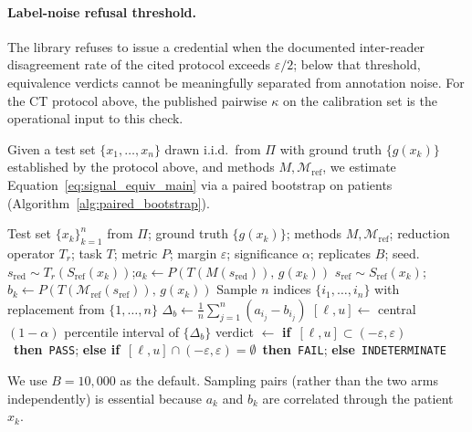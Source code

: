 \documentclass[twoside,11pt]{article}
\newcommand{\Mref}{\mathcal{M}_{\textrm{ref}}}
\newcommand{\Sref}{S_{\textrm{ref}}}
\begin{document}
\paragraph{Label-noise refusal threshold.} The library refuses to issue a credential when the documented inter-reader disagreement rate of the cited protocol exceeds $\varepsilon / 2$; below that threshold, equivalence verdicts cannot be meaningfully separated from annotation noise. For the CT protocol above, the published pairwise $\kappa$ on the calibration set is the operational input to this check.

Given a test set $\{x_1, \ldots, x_n\}$ drawn i.i.d.\ from $\Pi$ with ground truth $\{g(x_k)\}$ established by the protocol above, and methods $M, \Mref$, we estimate Equation~\eqref{eq:signal_equiv_main} via a paired bootstrap on patients (Algorithm~\ref{alg:paired_bootstrap}).

\begin{algorithm}[ht]
    \caption{Paired-bootstrap signal-equivalence credential}
    \label{alg:paired_bootstrap}
    \begin{algorithmic}[1]
        \Require Test set $\{x_k\}_{k=1}^n$ from $\Pi$; ground truth $\{g(x_k)\}$; methods $M, \Mref$; reduction operator $T_r$; task $T$; metric $P$; margin $\varepsilon$; significance $\alpha$; replicates $B$; seed.
            \State $s_{\textrm{red}} \sim T_r(\Sref(x_k))$;\quad $a_k \gets P(T(M(s_{\textrm{red}})),\, g(x_k))$
            \State $s_{\textrm{ref}} \sim \Sref(x_k)$;\quad $b_k \gets P(T(\Mref(s_{\textrm{ref}})),\, g(x_k))$
        \EndFor
            \State Sample $n$ indices $\{i_1, \ldots, i_n\}$ with replacement from $\{1, \ldots, n\}$
            \State $\Delta_b \gets \frac{1}{n}\sum_{j=1}^n (a_{i_j} - b_{i_j})$
        \EndFor
        \State $[\ell, u] \gets$ central $(1-\alpha)$ percentile interval of $\{\Delta_b\}$
        \State \Return verdict $\gets$ \textbf{if}~$[\ell, u] \subset (-\varepsilon, \varepsilon)$~\textbf{then}~\texttt{PASS}; \textbf{else if}~$[\ell, u] \cap (-\varepsilon, \varepsilon) = \emptyset$~\textbf{then}~\texttt{FAIL}; \textbf{else}~\texttt{INDETERMINATE}
    \end{algorithmic}
\end{algorithm}

We use $B = 10{,}000$ as the default. Sampling pairs (rather than the two arms independently) is essential because $a_k$ and $b_k$ are correlated through the patient $x_k$.
\end{document}
